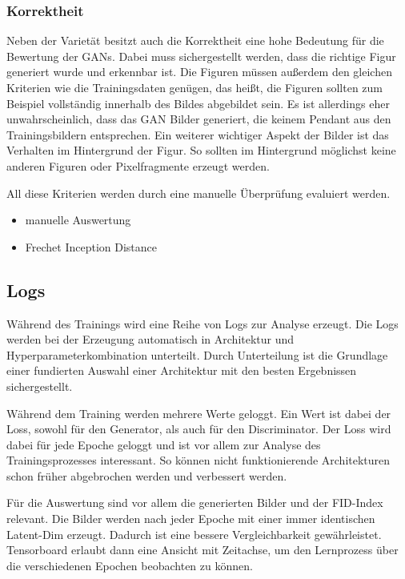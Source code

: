 \subsubsection{Korrektheit}
Neben der Varietät besitzt auch die Korrektheit eine hohe Bedeutung für die Bewertung der GANs.
Dabei muss sichergestellt werden, dass die richtige Figur generiert wurde und erkennbar ist.
Die Figuren müssen außerdem den gleichen Kriterien wie die Trainingsdaten genügen, das heißt, die Figuren sollten zum Beispiel vollständig innerhalb des Bildes abgebildet sein.
Es ist allerdings eher unwahrscheinlich, dass das GAN Bilder generiert, die keinem Pendant aus den Trainingsbildern entsprechen.
Ein weiterer wichtiger Aspekt der Bilder ist das Verhalten im Hintergrund der Figur.
So sollten im Hintergrund möglichst keine anderen Figuren oder Pixelfragmente erzeugt werden.

All diese Kriterien werden durch eine manuelle Überprüfung evaluiert werden.

\begin{itemize}
	\item manuelle Auswertung
	\item Frechet Inception Distance \cite{frechet-inception-distance}
\end{itemize}

\subsection{Logs}
Während des Trainings wird eine Reihe von Logs zur Analyse erzeugt.
Die Logs werden bei der Erzeugung automatisch in Architektur und Hyperparameterkombination unterteilt.
Durch Unterteilung ist die Grundlage einer fundierten Auswahl einer Architektur mit den besten Ergebnissen sichergestellt.
\newline

Während dem Training werden mehrere Werte geloggt.
Ein Wert ist dabei der Loss, sowohl für den Generator, als auch für den Discriminator.
Der Loss wird dabei für jede Epoche geloggt und ist vor allem zur Analyse des Trainingsprozesses interessant.
So können nicht funktionierende Architekturen schon früher abgebrochen werden und verbessert werden.
\newline

Für die Auswertung sind vor allem die generierten Bilder und der FID-Index relevant.
Die Bilder werden nach jeder Epoche mit einer immer identischen Latent-Dim erzeugt.
Dadurch ist eine bessere Vergleichbarkeit gewährleistet.
Tensorboard erlaubt dann eine Ansicht mit Zeitachse, um den Lernprozess über die verschiedenen Epochen beobachten zu können.
\newline

